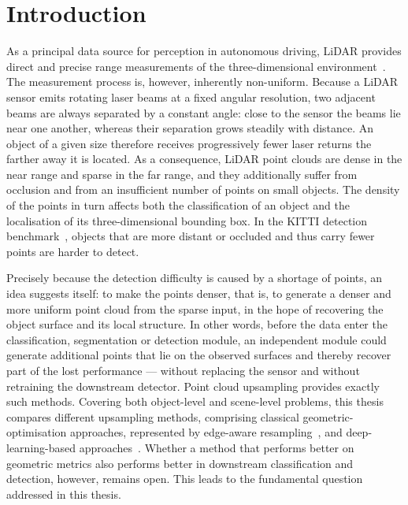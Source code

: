 \chapter{Introduction}
\label{chap:introduction}

As a principal data source for perception in autonomous driving, \ac{LiDAR}
provides direct and precise range measurements of the three-dimensional
environment~\cite{geiger2013kitti}. The measurement process is, however, inherently non-uniform.
Because a \ac{LiDAR} sensor emits rotating laser beams at a fixed angular
resolution, two adjacent beams are always separated by a constant angle:
close to the sensor the beams lie near one another, whereas their separation
grows steadily with distance. An object of a given size therefore receives
progressively fewer laser returns the farther away it is located. As a
consequence, \ac{LiDAR} point clouds are dense in the near range and sparse
in the far range, and they additionally suffer from occlusion and from an
insufficient number of points on small objects. The density of the points in
turn affects both the classification of an object and the localisation of
its three-dimensional bounding box. In the KITTI detection
benchmark~\cite{geiger2012kitti,geiger2013kitti}, objects that are more
distant or occluded and thus carry fewer points are harder to detect.

Precisely because the detection difficulty is caused by a shortage of
points, an idea suggests itself: to make the points denser, that is, to
generate a denser and more uniform point cloud from the sparse input, in the
hope of recovering the object surface and its local structure. In other
words, before the data enter the classification, segmentation or detection
module, an independent module could generate additional points that lie on
the observed surfaces and thereby recover part of the lost performance ---
without replacing the sensor and without retraining the downstream detector.
Point cloud upsampling provides exactly such methods. Covering both
object-level and scene-level problems, this thesis compares different
upsampling methods, comprising classical geometric-optimisation approaches,
represented by edge-aware resampling~\cite{huang2013ear}, and
deep-learning-based
approaches~\cite{yu2018punet,qian2021pugcn,kim2023puedgeformer,%
zhang2025pdans}. Whether a method that performs better on geometric metrics
also performs better in downstream classification and detection, however,
remains open. This leads to the fundamental question addressed in this
thesis.

